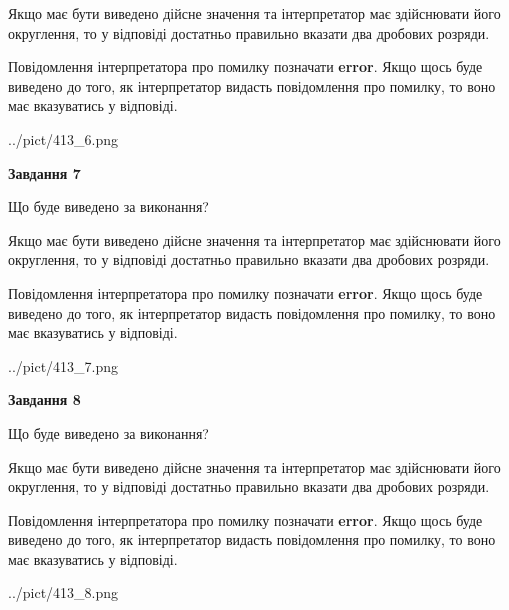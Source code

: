 \documentclass[12pt, ukrainian]{article}
\begin{document}
{\begin {Large}
Якщо має бути виведено дійсне значення та інтерпретатор має здійснювати його округлення, 
то у відповіді достатньо правильно вказати два дробових розряди.

Повідомлення інтерпретатора про помилку позначати \textbf{error}.
Якщо щось буде виведено до того, як інтерпретатор видасть повідомлення про помилку, 
то воно має вказуватись у відповіді. \par

\begin{center}
	{../pict/413_6.png}
\end{center}
\newpage

{\begin {center}\textbf{Завдання 7}\end {center}}\par
Що буде виведено за виконання? \par

Якщо має бути виведено дійсне значення та інтерпретатор має здійснювати його округлення, 
то у відповіді достатньо правильно вказати два дробових розряди.

Повідомлення інтерпретатора про помилку позначати \textbf{error}.
Якщо щось буде виведено до того, як інтерпретатор видасть повідомлення про помилку, 
то воно має вказуватись у відповіді. \par

\begin{center}
	{../pict/413_7.png}
\end{center}
\newpage

{\begin {center}\textbf{Завдання 8}\end {center}}\par
Що буде виведено за виконання? \par

Якщо має бути виведено дійсне значення та інтерпретатор має здійснювати його округлення, 
то у відповіді достатньо правильно вказати два дробових розряди.

Повідомлення інтерпретатора про помилку позначати \textbf{error}.
Якщо щось буде виведено до того, як інтерпретатор видасть повідомлення про помилку, 
то воно має вказуватись у відповіді. \par

\begin{center}
	{../pict/413_8.png}
\end{center}
\newpage


\end{Large}}
\end{document}
